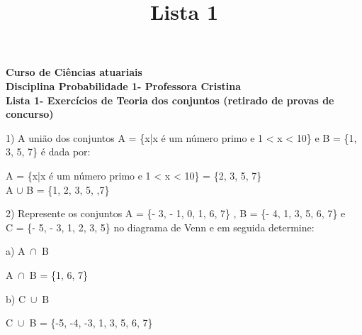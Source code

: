 \documentclass[12pt,a4paper,draft]{article}
\title{Lista 1}
\date{}
\begin{document}
	\maketitle
	\begin{center}
		\textbf{Curso de Ciências atuariais}\\
		\textbf{Disciplina Probabilidade 1- Professora Cristina}\\
		\textbf{Lista 1- Exercícios de Teoria dos conjuntos (retirado de provas de concurso)}
	\end{center}
	1) A união dos conjuntos A = \{x|x é um número primo e 1 < x < 10\} e B = \{1, 3, 5, 7\} é dada	por:
	\vspace{0.5cm}
	\begin{center}
		A = \{x|x é um número primo e 1 < x < 10\} = \{2, 3, 5, 7\}
		\vspace{0.5cm}\\
		A $\cup$ B = \{1, 2, 3, 5, ,7\}
	\end{center}
	\vspace{1cm}
	2) Represente os conjuntos A = \{- 3, - 1, 0, 1, 6, 7\} , B = \{- 4, 1, 3, 5, 6, 7\} e\\ C = \{- 5, - 3, 1, 2,	3, 5\} no diagrama de Venn e em seguida determine:\\
	\vspace{0.5cm}
	\begin{center}
		\begin{venndiagram3sets}[labelOnlyA={-1 0}, labelOnlyB={-4}, labelOnlyC={-5}, labelOnlyAB={6 7}, labelOnlyAC={-3}, labelOnlyBC={3 5}, labelABC={1}]
		\end{venndiagram3sets}
	\end{center}
	a) A $\cap$ B
	\vspace{0.5cm}
	\begin{center}
		A $\cap$ B = \{1, 6, 7\}
		\vspace{0.5cm}\\
		\begin{venndiagram3sets}[labelOnlyA={-1 0}, labelOnlyB={-4}, labelOnlyC={-5}, labelOnlyAB={6 7}, labelOnlyAC={-3}, labelOnlyBC={3 5}, labelABC={1}]
		\fillACapB
		\end{venndiagram3sets}
	\end{center}
	\vspace{1cm}
	b) C $\cup$ B
	\vspace{0.5cm}
	\begin{center}
		C $\cup$ B = \{-5, -4, -3, 1, 3, 5, 6, 7\}
		\vspace{0.5cm}\\
		\begin{venndiagram3sets}[labelOnlyA={-1 0}, labelOnlyB={-4}, labelOnlyC={-5}, labelOnlyAB={6 7}, labelOnlyAC={-3}, labelOnlyBC={3 5}, labelABC={1}]
			\fillB
			\fillC
		\end{venndiagram3sets}
	\end{center}
\end{document}
